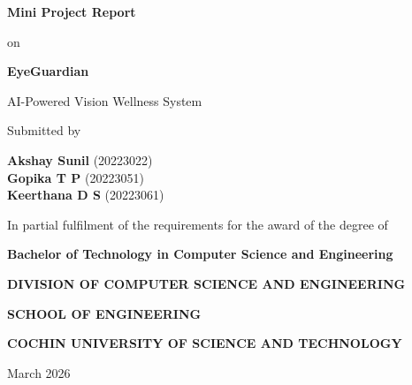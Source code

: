 \documentclass[12pt]{report}
\begin{document}

\begin{titlepage}

\begin{center}

{\Large \textbf{Mini Project Report}}

\vspace{0.5cm}

on

\vspace{0.5cm}

{\Huge \textbf{EyeGuardian}}

\vspace{0.2cm}

{\Large AI-Powered Vision Wellness System}

\vspace{1.5cm}

Submitted by

\vspace{0.5cm}

\textbf{Akshay Sunil} (20223022) \\
\textbf{Gopika T P} (20223051) \\
\textbf{Keerthana D S} (20223061)

\vspace{1cm}

In partial fulfilment of the requirements for the award of the degree of

\vspace{0.5cm}

\textbf{Bachelor of Technology in Computer Science and Engineering}

\vspace{1cm}

\textbf{DIVISION OF COMPUTER SCIENCE AND ENGINEERING}

\textbf{SCHOOL OF ENGINEERING}

\textbf{COCHIN UNIVERSITY OF SCIENCE AND TECHNOLOGY}

\vspace{1cm}

March 2026

\end{center}

\end{titlepage}

\end{document}
